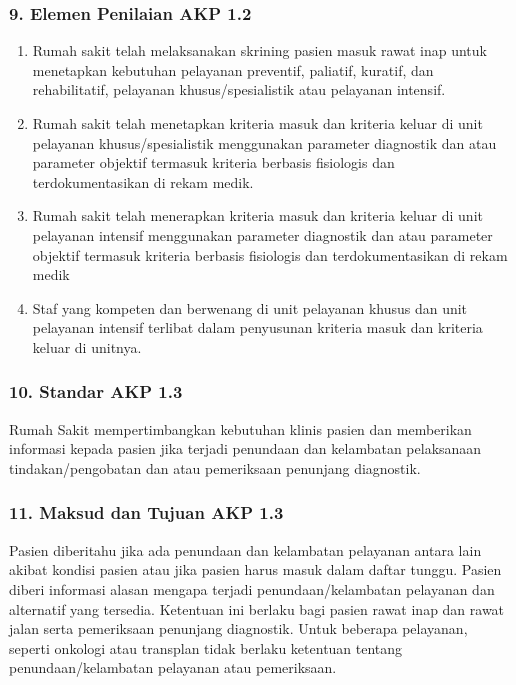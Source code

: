 \documentclass[
]{book}
\providecommand{\tightlist}{%
  \setlength{\itemsep}{0pt}\setlength{\parskip}{0pt}}
\begin{document}
\hypertarget{elemen-penilaian-akp-1.2}{%
\subsubsection*{9. Elemen Penilaian AKP 1.2}\label{elemen-penilaian-akp-1.2}}

\begin{enumerate}
\def\labelenumi{\alph{enumi}.}
\tightlist
\item
  Rumah sakit telah melaksanakan skrining pasien masuk rawat inap untuk menetapkan kebutuhan pelayanan preventif, paliatif, kuratif, dan rehabilitatif, pelayanan khusus/spesialistik atau pelayanan intensif.
\item
  Rumah sakit telah menetapkan kriteria masuk dan kriteria keluar di unit pelayanan khusus/spesialistik menggunakan parameter diagnostik dan atau parameter objektif termasuk kriteria berbasis fisiologis dan terdokumentasikan di rekam medik.
\item
  Rumah sakit telah menerapkan kriteria masuk dan kriteria keluar di unit pelayanan intensif menggunakan parameter diagnostik dan atau parameter objektif termasuk kriteria berbasis fisiologis dan terdokumentasikan di rekam medik
\item
  Staf yang kompeten dan berwenang di unit pelayanan khusus dan unit pelayanan intensif terlibat dalam penyusunan kriteria masuk dan kriteria keluar di unitnya.
\end{enumerate}

\hypertarget{standar-akp-1.3}{%
\subsubsection*{10. Standar AKP 1.3}\label{standar-akp-1.3}}

Rumah Sakit mempertimbangkan kebutuhan klinis pasien dan memberikan informasi kepada pasien jika terjadi penundaan dan kelambatan pelaksanaan tindakan/pengobatan dan atau pemeriksaan penunjang diagnostik.

\hypertarget{maksud-dan-tujuan-akp-1.3}{%
\subsubsection*{11. Maksud dan Tujuan AKP 1.3}\label{maksud-dan-tujuan-akp-1.3}}

Pasien diberitahu jika ada penundaan dan kelambatan pelayanan antara lain akibat kondisi pasien atau jika pasien harus masuk dalam daftar tunggu. Pasien diberi informasi alasan mengapa terjadi penundaan/kelambatan pelayanan dan alternatif yang tersedia. Ketentuan ini berlaku bagi pasien rawat inap dan rawat jalan serta pemeriksaan penunjang diagnostik. Untuk beberapa pelayanan, seperti onkologi atau transplan tidak berlaku ketentuan tentang penundaan/kelambatan pelayanan atau pemeriksaan.
\end{document}
